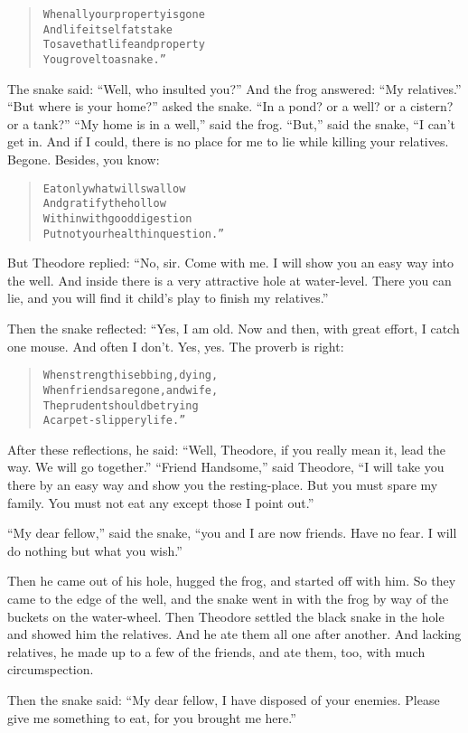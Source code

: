 \documentclass[article, twoside, 14pt]{memoir}
\renewenvironment{verbatim}{%
\begin{quote}%
\vskip -10pt%
\begin{alltt}\normalfont\large}{\end{alltt}%
\end{quote}%
\vskip -10pt
} %
\begin{document}
\begin{verbatim}
When all your property is gone
    And life itself at stake{\textemdash}
To save that life and property
    You grovel to a snake.”
\end{verbatim}
The snake said: ``Well, who insulted you?'' And the frog answered:
``My relatives.'' ``But where is your home?'' asked the snake.
``In a pond? or a well? or a cistern? or a tank?''
``My home is in a well,'' said the frog. ``But,'' said the snake,
“I can't get in. And if I could, there is no place for me to lie
while killing your relatives. Begone. Besides, you know:

\begin{verbatim}
Eat only what will swallow
And gratify the hollow
Within with good digestion{\textemdash}
Put not your health in question.”
\end{verbatim}
But Theodore replied:
``No, sir. Come with me. I will show you an easy way into the well. And inside there is a very attractive hole at water-level. There you can lie, and you will find it child's play to finish my relatives.''

Then the snake reflected: “Yes, I am old. Now and then, with great
effort, I catch one mouse. And often I don't. Yes, yes. The proverb
is right:

\begin{verbatim}
When strength is ebbing, dying,
    When friends are gone, and wife,
The prudent should be trying
    A carpet-slippery life.”
\end{verbatim}
After these reflections, he said:
``Well, Theodore, if you really mean it, lead the way. We will go together.''
``Friend Handsome,'' said Theodore,
``I will take you there by an easy way and show you the resting-place. But you must spare my family. You must not eat any except those I point out.''

``My dear fellow,'' said the snake,
``you and I are now friends. Have no fear. I will do nothing but what you wish.''

Then he came out of his hole, hugged the frog, and started off with
him. So they came to the edge of the well, and the snake went in
with the frog by way of the buckets on the water-wheel. Then
Theodore settled the black snake in the hole and showed him the
relatives. And he ate them all one after another. And lacking
relatives, he made up to a few of the friends, and ate them, too,
with much circumspection.

Then the snake said:
``My dear fellow, I have disposed of your enemies. Please give me something to eat, for you brought me here.''
\end{document}
